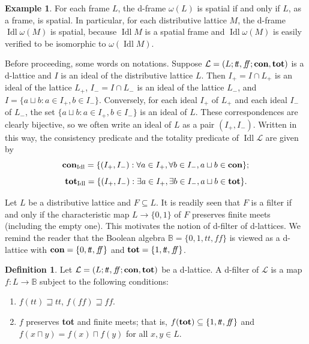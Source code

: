 \documentclass[11pt]{article}
\DeclareMathOperator{\idl}{Idl}
\theoremstyle{plain}
\theoremstyle{definition}
\newtheorem{defn}[thm]{Definition}
\newtheorem{exmp}[thm]{Example}
\newcommand{\bbB}{\mathbb{B}}
\newcommand{\dbt}{{t\!t}}
\newcommand{\dbf}{{f\!\!f}}
\newcommand{\lra}{\longrightarrow}
\begin{document}
\begin{exmp} \label{omega(L) is spatial} For each frame $L$, the d-frame $\omega(L)$ is spatial if and only if $L$, as a frame, is spatial. In particular, for each distributive lattice $M$, the d-frame $\idl\omega(M)$ is spatial, because  $\idl M$ is a spatial frame and  $\idl\omega(M)$ is easily verified to be isomorphic to $\omega(\idl M)$. \end{exmp}
  

Before proceeding, some words on notations.  Suppose $\mathcal{L}=(L;\dbt,\dbf;{\bf con},{\bf tot})$ is a d-lattice and $I$ is an ideal of the distributive lattice $L$. Then $I_+=I\cap L_+$ is an ideal of the lattice $L_+$, $I_-=I\cap L_-$ is an ideal of the lattice $L_-$, and $I=\{a\sqcup b:a\in I_+,b\in I_-\}$. Conversely, for each ideal $I_+$ of $L_+$ and each ideal $I_-$ of $L_-$, the set $\{a\sqcup b:a\in I_+,b\in I_-\}$ is an ideal of $L$. These correspondences are clearly bijective,  so we often write an ideal of $L$ as a pair $(I_+,I_-)$. Written in this way, the consistency predicate and the totality predicate of  $\idl\mathcal{L}$ are given by $${\bf con}_{\idl}=\{(I_+,I_-): \forall a\in I_+,\forall b\in I_-, a\sqcup b \in {\bf con}\};$$
$${\bf tot}_{\idl}=\{(I_+,I_-): \exists a\in I_+,\exists b\in I_-, a\sqcup b \in {\bf tot}\}.$$

Let $L$ be a distributive lattice and $F\subseteq L$. It is readily seen that $F$ is a filter if  and only if  the characteristic map $L\lra\{0,1\}$ of $F$ preserves finite meets (including the empty one). 
This motivates the notion of d-filter of d-lattices.  We remind the reader that the Boolean algebra $\mathbb{B}=\{0,1,\dbt,\dbf\}$ is viewed as a d-lattice with ${\bf con}=\{0,\dbt,\dbf\}$ and ${\bf tot}=\{1,\dbt,\dbf\}$. 

\begin{defn} 
Let $\mathcal{L}=(L;\dbt,\dbf;{\bf con},{\bf tot})$ be a d-lattice. A d-filter of $\mathcal{L}$ is a map $f\colon L\lra \bbB$ subject to the following conditions: \begin{enumerate}[label=\rm(\alph*)] \setlength{\itemsep}{0pt}    
\item  $f(\dbt)\sqsupseteq  \dbt$, $f(\dbf)\sqsupseteq \dbf$.  \item $f$ preserves  {\bf tot}
and finite meets; that is, $f({\bf tot})\subseteq\{1,\dbt,\dbf\}$  and $f(x\sqcap y)=f(x)\sqcap f(y)$ for all $x,y\in L$.  
\end{enumerate}  
\end{defn}
\end{document}
